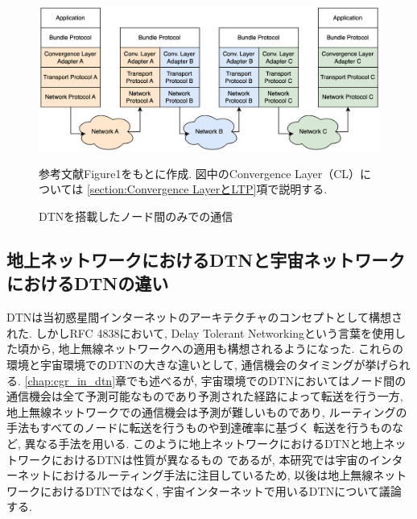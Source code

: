 
\begin{figure}[tbh]
    \centering
    \includegraphics[width=0.7\textheight]{img/dtnprotocolstack.pdf}
    \caption{DTNを搭載したノード間のみでの通信}
    \label{fig:dtnprotocolstack}
    \begin{minipage}{\textwidth}
        \raggedright
        \vspace{3mm}
        \fontsize{10.5pt}{12pt}\selectfont
        参考文献\cite{bundle_protocol_architecture}Figure1をもとに作成. 
        図中のConvergence Layer（CL）については
        \ref{section:Convergence LayerとLTP}項で説明する.
    \end{minipage}
\end{figure}

\subsection{地上ネットワークにおけるDTNと宇宙ネットワークにおけるDTNの違い}
DTNは当初惑星間インターネットのアーキテクチャのコンセプトとして構想された. しかしRFC 4838\cite{rfc4838}において, 
Delay Tolerant Networkingという言葉を使用した頃から, 地上無線ネットワークへの適用も構想されるようになった. 
これらの環境と宇宙環境でのDTNの大きな違いとして, 通信機会のタイミングが挙げられる. 
\ref{chap:cgr_in_dtn}章でも述べるが, 
宇宙環境でのDTNにおいてはノード間の通信機会は全て予測可能なものであり予測された経路によって転送を行う一方, 
地上無線ネットワークでの通信機会は予測が難しいものであり, ルーティングの手法もすべてのノードに転送を行うものや到達確率に基づく
転送を行うものなど, 異なる手法を用いる. このように地上ネットワークにおけるDTNと地上ネットワークにおけるDTNは性質が異なるもの
であるが, 本研究では宇宙のインターネットにおけるルーティング手法に注目しているため, 以後は地上無線ネットワークにおけるDTNではなく, 
宇宙インターネットで用いるDTNについて議論する. 

